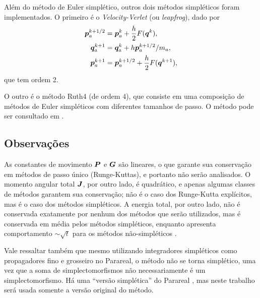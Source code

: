 Além do método de Euler simplético, outros dois métodos simpléticos foram implementados. O primeiro é o \textit{Velocity-Verlet} (ou \textit{leapfrog}), dado por
\begin{align*}
  \bm p_a^{k + 1/2} &= \bm p_a^{k} + \dfrac{h}{2} F(\bm q^{k}), \\
  \bm q_a^{k + 1} &= \bm q_a^k + h \bm p_a^{k + 1/2} / m_a, \\
  \bm p_a^{k + 1} &= \bm p_a^{k + 1/2} + \dfrac{h}{2} F(\bm q^{k+1}),
\end{align*}
que tem ordem 2.

O outro é o método Ruth4 (de ordem 4), que consiste em uma composição de métodos de Euler simpléticos com diferentes tamanhos de passo. O método pode ser consultado em \cite[pp.57-59]{tcc}.

\subsection{Observações}

As constantes de movimento $\bm P$ e $\bm G$ são lineares, o que garante sua conservação em métodos de passo único (Runge-Kuttas), e portanto não serão analisados. O momento angular total $\bm J$, por outro lado, é quadrático, e apenas algumas classes de métodos garantem sua conservação; não é o caso dos Runge-Kutta explícitos, mas é o caso dos métodos simpléticos. A energia total, por outro lado, não é conservada exatamente por nenhum dos métodos que serão utilizados, mas é conservada em média pelos métodos simpléticos, enquanto apresenta comportamento $\sim \sqrt{t}$ para os métodos não-simpléticos \cite{hairer, Brouwer1937}.

Vale ressaltar também que mesmo utilizando integradores simpléticos como propagadores fino e grosseiro no Parareal, o método não se torna simplético, uma vez que a soma de simplectomorfismos não necessariamente é um simplectomorfismo. Há uma ``versão simplética'' do Parareal \cite{bal2008symplectic}, mas neste trabalho será usada somente a versão original do método.